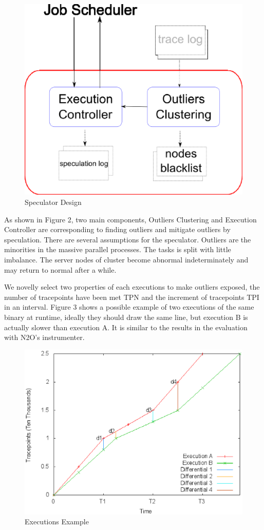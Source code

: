 \begin{figure}
\centering
\includegraphics[width=0.9\columnwidth]{figures/speculator.eps}
\caption{Speculator Design}
\label{figure:speculator}
\end{figure}

As shown in Figure 2, two main components, Outliers Clustering and Execution Controller are corresponding to finding outliers and mitigate outliers by speculation. There are several assumptions for the speculator. Outliers are the minorities in the massive parallel processes. The tasks is split with little imbalance. The server nodes of cluster become abnormal indeterminately and may return to normal after a while.

We novelly select two properties of each executions to make outliers exposed, the number of tracepoints have been met TPN and the increment of tracepoints TPI in an interval. Figure 3 shows a possible example of two executions of the same binary at runtime, ideally they should draw the same line, but execution B is actually slower than execution A. It is similar to the results in the evaluation with N2O’s instrumenter.

\begin{figure}
\centering
\includegraphics[width=0.9\columnwidth]{figures/executions_example.eps}
\caption{Executions Example}
\label{figure:executionsexample}
\end{figure}

